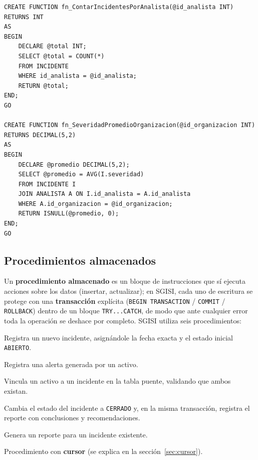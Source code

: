 \documentclass[11pt,a4paper]{article}
\begin{document}
\begin{lstlisting}
CREATE FUNCTION fn_ContarIncidentesPorAnalista(@id_analista INT)
RETURNS INT
AS
BEGIN
    DECLARE @total INT;
    SELECT @total = COUNT(*)
    FROM INCIDENTE
    WHERE id_analista = @id_analista;
    RETURN @total;
END;
GO

CREATE FUNCTION fn_SeveridadPromedioOrganizacion(@id_organizacion INT)
RETURNS DECIMAL(5,2)
AS
BEGIN
    DECLARE @promedio DECIMAL(5,2);
    SELECT @promedio = AVG(I.severidad)
    FROM INCIDENTE I
    JOIN ANALISTA A ON I.id_analista = A.id_analista
    WHERE A.id_organizacion = @id_organizacion;
    RETURN ISNULL(@promedio, 0);
END;
GO
\end{lstlisting}

\subsection{Procedimientos almacenados}

Un \textbf{procedimiento almacenado} es un bloque de instrucciones que sí ejecuta
acciones sobre los datos (insertar, actualizar); en SGISI, cada uno de escritura se
protege con una \textbf{transacción} explícita (\texttt{BEGIN TRANSACTION} /
\texttt{COMMIT} / \texttt{ROLLBACK}) dentro de un bloque \texttt{TRY...CATCH}, de
modo que ante cualquier error toda la operación se deshace por completo. SGISI
utiliza seis procedimientos:

\begin{description}[leftmargin=0pt, style=nextline]
\item[\texttt{sp\_RegistrarIncidente}] Registra un nuevo incidente, asignándole la
fecha exacta y el estado inicial \texttt{ABIERTO}.
\item[\texttt{sp\_RegistrarAlerta}] Registra una alerta generada por un activo.
\item[\texttt{sp\_AsignarActivoAIncidente}] Vincula un activo a un incidente en la
tabla puente, validando que ambos existan.
\item[\texttt{sp\_CerrarIncidente}] Cambia el estado del incidente a \texttt{CERRADO}
y, en la misma transacción, registra el reporte con conclusiones y recomendaciones.
\item[\texttt{sp\_GenerarReporte}] Genera un reporte para un incidente existente.
\item[\texttt{sp\_ResumenSeguridadPorAnalista}] Procedimiento con \textbf{cursor}
(se explica en la sección~\ref{sec:cursor}).
\end{description}
\end{document}
